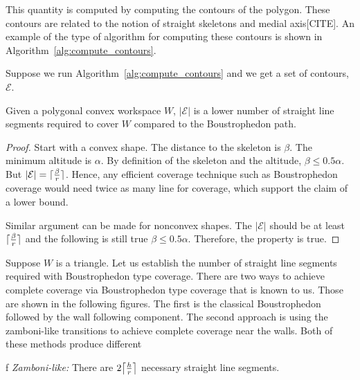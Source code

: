 \documentclass[../main.tex]{subfiles}
\begin{document}
This quantity is computed by computing the contours of the polygon. These contours are related to the notion of straight skeletons and medial axis[CITE]. An example of the type of algorithm for computing these contours is shown in Algorithm~\ref{alg:compute_contours}.

Suppose we run Algorithm~\ref{alg:compute_contours} and we get a set of contours, $\mathcal{E}$.

\begin{proposition}
	Given a polygonal convex workspace $W$, $|\mathcal{E}|$ is a lower number of straight line segments required to cover $W$ compared to the Boustrophedon path.
\end{proposition}
\begin{proof}

Start with a convex shape. The distance to the skeleton is $\beta$. The minimum altitude is $\alpha$. By definition of the skeleton and the altitude, $\beta\leq 0.5\alpha$. But $|\mathcal{E}|=\lceil\frac{\beta}{r}\rceil$. Hence, any efficient coverage technique such as Boustrophedon coverage would need twice as many line for coverage, which support the claim of a lower bound.

Similar argument can be made for nonconvex shapes. The $|\mathcal{E}|$ should be at least $\lceil\frac{\beta}{r}\rceil$ and the following is still true $\beta\leq 0.5\alpha$. Therefore, the property is true.
\end{proof}




\iffalse
Suppose $W$ is a triangle. Let us establish the number of straight line segments required with Boustrophedon type coverage. There are two ways to achieve complete coverage via Boustrophedon type coverage that is known to us. Those are shown in the following figures. The first is the classical Boustrophedon followed by the wall following component. The second approach is using the zamboni-like transitions to achieve complete coverage near the walls. Both of these methods produce different 

f
\emph{Zamboni-like:} There are $2\ceil*{\frac{h}{r}}$ necessary straight line segments.
\end{document}
